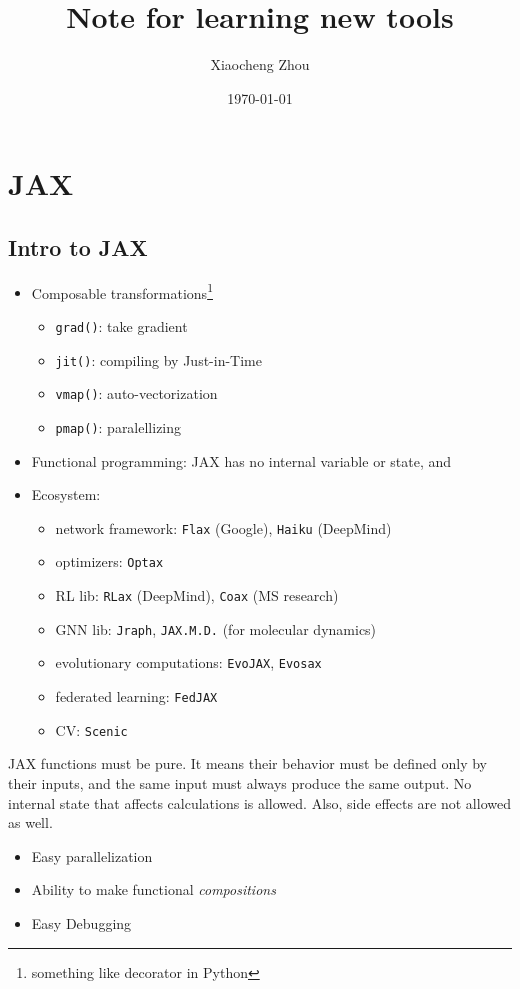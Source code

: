 \documentclass[en,hazy,screen,blue,14pt]{elegantnote}
\title{Note for learning new tools}
\author{Xiaocheng Zhou}
\institute{STA, CUHK}
\date{\today}
\begin{document}
\maketitle

\newpage

\section{JAX}
\subsection{Intro to JAX}
\begin{itemize}
    \item Composable transformations\footnote{something like decorator in Python}
    \begin{itemize}
        \item \texttt{grad()}: take gradient
        \item \texttt{jit()}: compiling by Just-in-Time
        \item \texttt{vmap()}: auto-vectorization
        \item \texttt{pmap()}: paralellizing
    \end{itemize}
    \item Functional programming: JAX has no internal variable or state, and 
    \item Ecosystem: 
    \begin{itemize}
        \item network framework: \texttt{Flax} (Google), \texttt{Haiku} (DeepMind)
        \item optimizers: \texttt{Optax}
        \item RL lib: \texttt{RLax} (DeepMind), \texttt{Coax} (MS research)
        \item GNN lib: \texttt{Jraph}, \texttt{JAX.M.D.} (for molecular dynamics)
        \item evolutionary computations: \texttt{EvoJAX}, \texttt{Evosax}
        \item federated learning: \texttt{FedJAX}
        \item CV: \texttt{Scenic}
    \end{itemize}
\end{itemize}

\begin{remark}
    JAX functions must be pure. 
    It means their behavior must be defined only by their inputs, 
    and the same input must always produce the same output. 
    No internal state that affects calculations is allowed. 
    Also, side effects are not allowed as well.
    \begin{itemize}
        \item Easy parallelization
        \item Ability to make functional \textit{compositions}
        \item Easy Debugging
    \end{itemize}
\end{remark}
\end{document}
